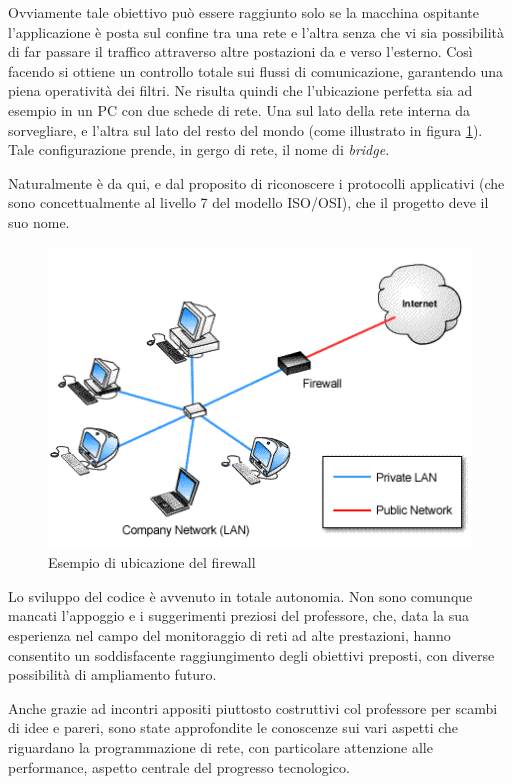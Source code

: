 Ovviamente tale obiettivo può essere raggiunto solo se la macchina ospitante l'applicazione è posta sul confine tra una rete e l'altra senza che vi sia possibilità di far passare il traffico attraverso altre postazioni da e verso l'esterno. Così facendo si ottiene un controllo totale sui flussi di comunicazione, garantendo una piena operatività dei filtri. Ne risulta quindi che l'ubicazione perfetta sia ad esempio in un PC con due schede di rete. Una sul lato della rete interna da sorvegliare, e l'altra sul lato del resto del mondo (come illustrato in figura \ref{ubifw}). Tale configurazione prende, in gergo di rete, il nome di \emph{bridge}.

Naturalmente è da qui, e dal proposito di riconoscere i protocolli applicativi (che sono concettualmente al livello 7 del modello ISO/OSI), che il progetto deve il suo nome.

\begin{figure}[!htbp] %
\begin{center}
\includegraphics[scale=0.5]{img/ubicazione_fw.png}
\caption{Esempio di ubicazione del firewall}\label{ubifw}
\end{center}
\end{figure}

Lo sviluppo del codice è avvenuto in totale autonomia. Non sono comunque mancati l'appoggio e i suggerimenti preziosi del professore, che, data la sua esperienza nel campo del monitoraggio di reti ad alte prestazioni, hanno consentito un soddisfacente raggiungimento degli obiettivi preposti, con diverse possibilità di ampliamento futuro.

Anche grazie ad incontri appositi piuttosto costruttivi col professore per scambi di idee e pareri, sono state approfondite le conoscenze sui vari aspetti che riguardano la programmazione di rete, con particolare attenzione alle performance, aspetto centrale del progresso tecnologico.


